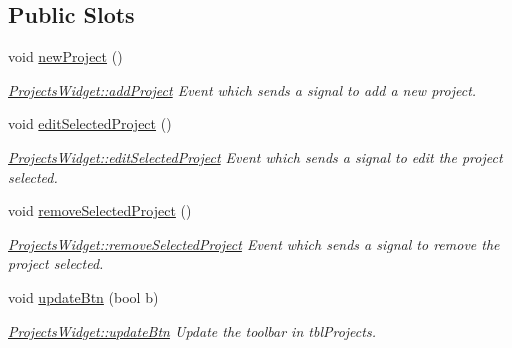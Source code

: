 \subsection*{Public Slots}
\begin{DoxyCompactItemize}
\item 
\hypertarget{classGui_1_1Widgets_1_1ProjectsWidget_acd6cd65ef7bf569ce4e44436d2f8b4f4}{}void \hyperlink{classGui_1_1Widgets_1_1ProjectsWidget_acd6cd65ef7bf569ce4e44436d2f8b4f4}{new\+Project} ()\label{classGui_1_1Widgets_1_1ProjectsWidget_acd6cd65ef7bf569ce4e44436d2f8b4f4}

\begin{DoxyCompactList}\small\item\em \hyperlink{classGui_1_1Widgets_1_1ProjectsWidget_a25a20fde082c2698d7067d10e5795c0f}{Projects\+Widget\+::add\+Project} Event which sends a signal to add a new project. \end{DoxyCompactList}\item 
\hypertarget{classGui_1_1Widgets_1_1ProjectsWidget_a33284320194d2c20ac6a47ebaaa57ad4}{}void \hyperlink{classGui_1_1Widgets_1_1ProjectsWidget_a33284320194d2c20ac6a47ebaaa57ad4}{edit\+Selected\+Project} ()\label{classGui_1_1Widgets_1_1ProjectsWidget_a33284320194d2c20ac6a47ebaaa57ad4}

\begin{DoxyCompactList}\small\item\em \hyperlink{classGui_1_1Widgets_1_1ProjectsWidget_a33284320194d2c20ac6a47ebaaa57ad4}{Projects\+Widget\+::edit\+Selected\+Project} Event which sends a signal to edit the project selected. \end{DoxyCompactList}\item 
\hypertarget{classGui_1_1Widgets_1_1ProjectsWidget_a02d9111ae56ff401bc512fa218161d94}{}void \hyperlink{classGui_1_1Widgets_1_1ProjectsWidget_a02d9111ae56ff401bc512fa218161d94}{remove\+Selected\+Project} ()\label{classGui_1_1Widgets_1_1ProjectsWidget_a02d9111ae56ff401bc512fa218161d94}

\begin{DoxyCompactList}\small\item\em \hyperlink{classGui_1_1Widgets_1_1ProjectsWidget_a02d9111ae56ff401bc512fa218161d94}{Projects\+Widget\+::remove\+Selected\+Project} Event which sends a signal to remove the project selected. \end{DoxyCompactList}\item 
void \hyperlink{classGui_1_1Widgets_1_1ProjectsWidget_a3051880516e89826876afdf01fa6637a}{update\+Btn} (bool b)
\begin{DoxyCompactList}\small\item\em \hyperlink{classGui_1_1Widgets_1_1ProjectsWidget_a3051880516e89826876afdf01fa6637a}{Projects\+Widget\+::update\+Btn} Update the toolbar in tbl\+Projects. \end{DoxyCompactList}\end{DoxyCompactItemize}
